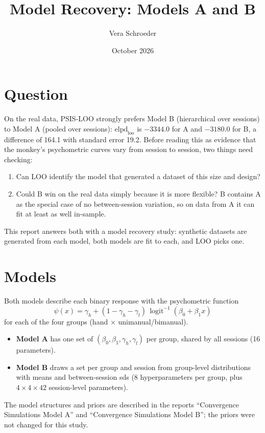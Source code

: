 \documentclass[11pt]{article}
\title{Model Recovery: Models A and B}
\author{Vera Schroeder}
\date{October 2026}
\newcommand{\elpd}{\text{elpd}_\text{loo}}
\begin{document}
\maketitle

\section{Question}

On the real data, PSIS-LOO strongly prefers Model B (hierarchical over sessions) to
Model A (pooled over sessions): $\elpd$ is $-3344.0$ for A and $-3180.0$ for B, a
difference of 164.1 with standard error 19.2. Before reading this as evidence that
the monkey's psychometric curves vary from session to session, two things need
checking:
\begin{enumerate}
  \item Can LOO identify the model that generated a dataset of this size and design?
  \item Could B win on the real data simply because it is more flexible? B contains
        A as the special case of no between-session variation, so on data from A it
        can fit at least as well in-sample.
\end{enumerate}
This report answers both with a model recovery study: synthetic datasets are
generated from each model, both models are fit to each, and LOO picks one.

\section{Models}

Both models describe each binary response with the psychometric function
\[
  \psi(x) = \gamma_h + (1-\gamma_h-\gamma_l)\,\operatorname{logit}^{-1}(\beta_0 + \beta_1 x)
\]
for each of the four groups (hand $\times$ unimanual/bimanual).
\begin{itemize}
  \item \textbf{Model A} has one set of $(\beta_0, \beta_1, \gamma_h, \gamma_l)$ per
        group, shared by all sessions (16 parameters).
  \item \textbf{Model B} draws a set per group and session from group-level
        distributions with means and between-session sds (8 hyperparameters per
        group, plus $4 \times 4 \times 42$ session-level parameters).
\end{itemize}
The model structures and priors are described in the reports
``Convergence Simulations Model A'' and ``Convergence Simulations Model B''; the
priors were not changed for this study.
\end{document}
